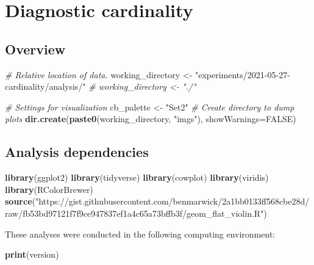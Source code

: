 \documentclass[]{book}
\newenvironment{Shaded}{\begin{snugshade}}{\end{snugshade}}
\newcommand{\CommentTok}[1]{\textcolor[rgb]{0.56,0.35,0.01}{\textit{#1}}}
\newcommand{\DataTypeTok}[1]{\textcolor[rgb]{0.13,0.29,0.53}{#1}}
\newcommand{\KeywordTok}[1]{\textcolor[rgb]{0.13,0.29,0.53}{\textbf{#1}}}
\newcommand{\NormalTok}[1]{#1}
\newcommand{\OtherTok}[1]{\textcolor[rgb]{0.56,0.35,0.01}{#1}}
\newcommand{\StringTok}[1]{\textcolor[rgb]{0.31,0.60,0.02}{#1}}
\begin{document}
\hypertarget{diagnostic-cardinality}{%
\chapter{Diagnostic cardinality}\label{diagnostic-cardinality}}

\hypertarget{overview-1}{%
\section{Overview}\label{overview-1}}

\begin{Shaded}
\begin{Highlighting}[]
\CommentTok{# Relative location of data.}
\NormalTok{working_directory <-}
\StringTok{  "experiments/2021-05-27-cardinality/analysis/"}
\CommentTok{# working_directory <- "./"}

\CommentTok{# Settings for visualization}
\NormalTok{cb_palette <-}\StringTok{ "Set2"}
\CommentTok{# Create directory to dump plots}
\KeywordTok{dir.create}\NormalTok{(}\KeywordTok{paste0}\NormalTok{(working_directory, }\StringTok{"imgs"}\NormalTok{), }\DataTypeTok{showWarnings=}\OtherTok{FALSE}\NormalTok{)}
\end{Highlighting}
\end{Shaded}

\hypertarget{analysis-dependencies-1}{%
\section{Analysis dependencies}\label{analysis-dependencies-1}}

\begin{Shaded}
\begin{Highlighting}[]
\KeywordTok{library}\NormalTok{(ggplot2)}
\KeywordTok{library}\NormalTok{(tidyverse)}
\KeywordTok{library}\NormalTok{(cowplot)}
\KeywordTok{library}\NormalTok{(viridis)}
\KeywordTok{library}\NormalTok{(RColorBrewer)}
\KeywordTok{source}\NormalTok{(}\StringTok{"https://gist.githubusercontent.com/benmarwick/2a1bb0133ff568cbe28d/raw/fb53bd97121f7f9ce947837ef1a4c65a73bffb3f/geom_flat_violin.R"}\NormalTok{)}
\end{Highlighting}
\end{Shaded}

These analyses were conducted in the following computing environment:

\begin{Shaded}
\begin{Highlighting}[]
\KeywordTok{print}\NormalTok{(version)}
\end{Highlighting}
\end{Shaded}
\end{document}
